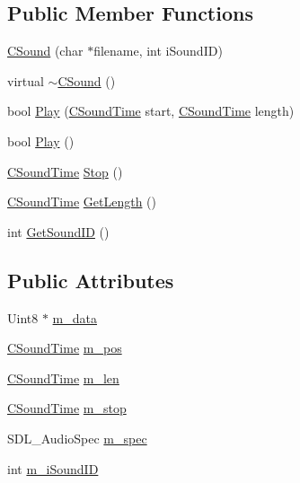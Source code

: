 \subsection*{Public Member Functions}
\begin{DoxyCompactItemize}
\item 
\hyperlink{class_c_sound_a57c4b63acfa422461526dee33fc317d8}{C\+Sound} (char $\ast$filename, int i\+Sound\+ID)
\item 
virtual \hyperlink{class_c_sound_afe00e938f0c637e80ae2e3d30faa5add}{$\sim$\+C\+Sound} ()
\item 
bool \hyperlink{class_c_sound_a17f9bef660b17787ac312ce02446ac96}{Play} (\hyperlink{class_c_sound_time}{C\+Sound\+Time} start, \hyperlink{class_c_sound_time}{C\+Sound\+Time} length)
\item 
bool \hyperlink{class_c_sound_a413a563864ccdfaeab232a3c36025a0a}{Play} ()
\item 
\hyperlink{class_c_sound_time}{C\+Sound\+Time} \hyperlink{class_c_sound_a366c42ebc2c48e56e0788caa72f226df}{Stop} ()
\item 
\hyperlink{class_c_sound_time}{C\+Sound\+Time} \hyperlink{class_c_sound_a81b39696be6a9aff2aa09f1fed26e750}{Get\+Length} ()
\item 
int \hyperlink{class_c_sound_ac08135b722291ee5222067bbed669994}{Get\+Sound\+ID} ()
\end{DoxyCompactItemize}
\subsection*{Public Attributes}
\begin{DoxyCompactItemize}
\item 
Uint8 $\ast$ \hyperlink{class_c_sound_a3f49133f65666c8edd9f46d7c9f49161}{m\+\_\+data}
\item 
\hyperlink{class_c_sound_time}{C\+Sound\+Time} \hyperlink{class_c_sound_aa1b6ed3838420f7d7c99ca7805106829}{m\+\_\+pos}
\item 
\hyperlink{class_c_sound_time}{C\+Sound\+Time} \hyperlink{class_c_sound_a1e31a63957e73925bee5871f85e5f2f6}{m\+\_\+len}
\item 
\hyperlink{class_c_sound_time}{C\+Sound\+Time} \hyperlink{class_c_sound_a26b1e9f2a8e7b3a8b2ba313ff56fa199}{m\+\_\+stop}
\item 
S\+D\+L\+\_\+\+Audio\+Spec \hyperlink{class_c_sound_ac41facd6fbd54c78f6b2d19608aa3217}{m\+\_\+spec}
\item 
int \hyperlink{class_c_sound_a267778ee9ca3f7fed5b344a09a24f2eb}{m\+\_\+i\+Sound\+ID}
\end{DoxyCompactItemize}


